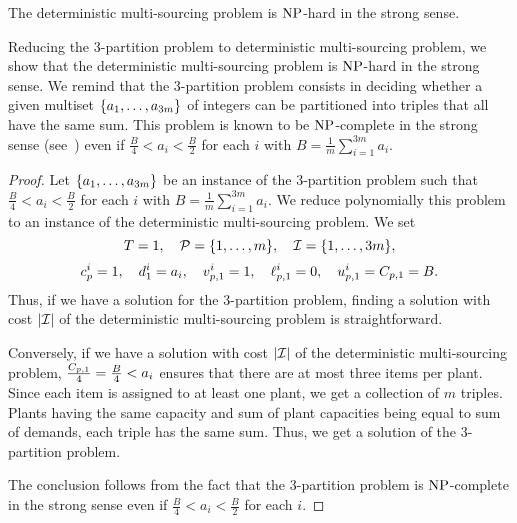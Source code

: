 \begin{thm}\label{thm:deterministic-multi-sourcing:strong-NP-hard}
The deterministic multi-sourcing problem is $\operatorname{NP}$-hard in the strong sense.
\end{thm}


Reducing the 3-partition problem to deterministic multi-sourcing problem, we show that the deterministic multi-sourcing problem is $\operatorname{NP}$-hard in the strong sense.
We remind that the 3-partition problem consists in deciding whether a given multiset $\crbracket{a_1,\ldots,a_{3m}}$ of integers can be partitioned into triples that all have the same sum.
This problem is known to be $\operatorname{NP}$-complete in the strong sense (see~\cite{Garey1979}) even if $\frac{B}{4} < a_i < \frac{B}{2}$ for each $i$ with $B=\frac{1}{m}\sum_{i=1}^{3m}a_i$.



\begin{proof}
Let $\crbracket{a_1,\ldots,a_{3m}}$ be an instance of the 3-partition problem such that $\frac{B}{4} < a_i < \frac{B}{2}$ for each $i$ with $B=\frac{1}{m}\sum_{i=1}^{3m}a_i$.
We reduce polynomially this problem to an instance of the deterministic multi-sourcing problem.
We set
$$
  \horizon=1
  ,\quad
  \plants=\range[1]{m}
  ,\quad
  \REF=\range[1]{3m},
$$
$$
  c_p^i=1
  ,\quad
  d_1^i=a_i
  ,\quad
  v_{p,1}^i=1
  ,\quad
  \ell_{p,1}^i=0
  ,\quad
  u_{p,1}^i=C_{p,1}=B.
$$
Thus, if we have a solution for the 3-partition problem, finding a solution with cost $\card{\REF}$ of the deterministic multi-sourcing problem is straightforward.

Conversely, if we have a solution with cost $\card{\REF}$ of the deterministic multi-sourcing problem, $\frac{C_{p,1}}{4}=\frac{B}{4} < a_i$ ensures that there are at most three items per plant.
Since each item is assigned to at least one plant, we get a collection of $m$ triples.
Plants having the same capacity and sum of plant capacities being equal to sum of demands, each triple has the same sum.
Thus, we get a solution of the 3-partition problem.

The conclusion follows from the fact that the 3-partition problem is $\operatorname{NP}$-complete in the strong sense even if $\frac{B}{4} < a_i < \frac{B}{2}$ for each $i$.
\end{proof}


